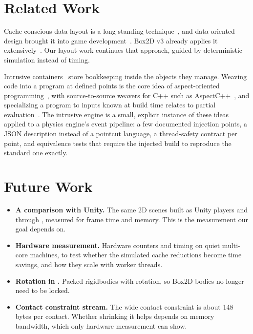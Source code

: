 \documentclass[11pt]{article}
\newcommand{\code}[1]{\texttt{\detokenize{#1}}}
\begin{document}
\section{Related Work}

Cache-conscious data layout is a long-standing technique~\cite{chilimbi1999layout,drepper2007memory},
and data-oriented design brought it into game development~\cite{fabian2018dod}. Box2D v3 already
applies it extensively~\cite{catto_box2d}. Our layout work continues that approach, guided by
deterministic simulation instead of timing.

Intrusive containers~\cite{boost_intrusive} store bookkeeping inside the objects they manage.
Weaving code into a program at defined points is the core idea of aspect-oriented
programming~\cite{kiczales1997aop}, with source-to-source weavers for C++ such as
AspectC++~\cite{spinczyk2002aspectcpp}, and specializing a program to inputs known at build time
relates to partial evaluation~\cite{jones1993partial}. The intrusive engine is a small, explicit
instance of these ideas applied to a physics engine's event pipeline: a few documented injection
points, a JSON description instead of a pointcut language, a thread-safety contract per point, and
equivalence tests that require the injected build to reproduce the standard one exactly.

\section{Future Work}
\label{sec:future}

\begin{itemize}[leftmargin=*,itemsep=2pt]
  \item \textbf{A comparison with Unity.} The same 2D scenes built as Unity players and through
        \code{unity_pack}, measured for frame time and memory. This is the measurement our goal
        depends on.
  \item \textbf{Hardware measurement.} Hardware counters and timing on quiet multi-core machines,
        to test whether the simulated cache reductions become time savings, and how they scale
        with worker threads.
  \item \textbf{Rotation in \code{unity_pack}.} Packed rigidbodies with rotation, so Box2D bodies no
        longer need to be locked.
  \item \textbf{Contact constraint stream.} The wide contact constraint is about 148 bytes per
        contact. Whether shrinking it helps depends on memory bandwidth, which only hardware
        measurement can show.
\end{itemize}
\end{document}
